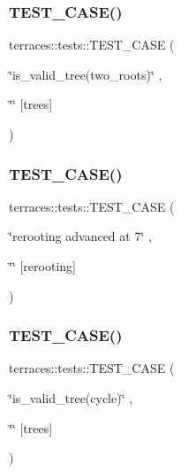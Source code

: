\subsubsection{\texorpdfstring{T\+E\+S\+T\+\_\+\+C\+A\+S\+E()}{TEST\_CASE()}\hspace{0.1cm}{\footnotesize\ttfamily [59/78]}}
{\footnotesize\ttfamily terraces\+::tests\+::\+T\+E\+S\+T\+\_\+\+C\+A\+SE (\begin{DoxyParamCaption}\item[{\char`\"{}is\+\_\+valid\+\_\+tree(two\+\_\+roots)\char`\"{}}]{,  }\item[{\char`\"{}\char`\"{}}]{\mbox{[}trees\mbox{]} }\end{DoxyParamCaption})}

\mbox{\label{namespaceterraces_1_1tests_ac3f9f6c569f089f3ac339eb68576cdfe}} 
\subsubsection{\texorpdfstring{T\+E\+S\+T\+\_\+\+C\+A\+S\+E()}{TEST\_CASE()}\hspace{0.1cm}{\footnotesize\ttfamily [60/78]}}
{\footnotesize\ttfamily terraces\+::tests\+::\+T\+E\+S\+T\+\_\+\+C\+A\+SE (\begin{DoxyParamCaption}\item[{\char`\"{}rerooting advanced at 7\char`\"{}}]{,  }\item[{\char`\"{}\char`\"{}}]{\mbox{[}rerooting\mbox{]} }\end{DoxyParamCaption})}

\mbox{\label{namespaceterraces_1_1tests_a800f722181e2b2cc84c8b5178dc3b839}} 
\subsubsection{\texorpdfstring{T\+E\+S\+T\+\_\+\+C\+A\+S\+E()}{TEST\_CASE()}\hspace{0.1cm}{\footnotesize\ttfamily [61/78]}}
{\footnotesize\ttfamily terraces\+::tests\+::\+T\+E\+S\+T\+\_\+\+C\+A\+SE (\begin{DoxyParamCaption}\item[{\char`\"{}is\+\_\+valid\+\_\+tree(cycle)\char`\"{}}]{,  }\item[{\char`\"{}\char`\"{}}]{\mbox{[}trees\mbox{]} }\end{DoxyParamCaption})}

